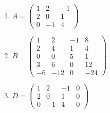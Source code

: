 \documentclass[11pt,fleqn]{article}
\begin{document}
\renewcommand{\headrulewidth}{0pt}
\newcommand{\blank}[1]{\rule{#1}{0.75pt}}
\renewcommand{\d}{\displaystyle}
\newcommand{\bpm}{\begin{pmatrix}}
\newcommand{\epm}{\end{pmatrix}}

\vspace*{-0.7in}

\begin{center}
  \large {}
\end{center}
\begin{enumerate}
\item $A=\bpm 1&2&-1\\2&0&1\\0&-1&4 \epm$
\vfill

\item $B=\bpm 1&2&-1&8\\2&4&1&4\\0&0&5&1\\3&6&0&12 \\-6&-12&0&-24 \epm$
\vfill 
\newpage
\item $D=\bpm 1&2&-1&0\\2&0&1&0\\0&-1&4 &0\epm$
\end{enumerate}
\end{document}
